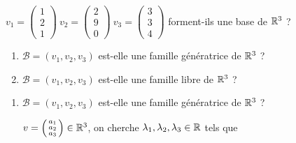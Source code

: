 \begin{frame}
\begin{exemple}

$v_1 = \left(\begin{smallmatrix}1\\2\\1\end{smallmatrix}\right)~ 
  v_2 = \left(\begin{smallmatrix}2\\9\\0\end{smallmatrix}\right)~
  v_3 = \left(\begin{smallmatrix}3\\3\\4\end{smallmatrix}\right)$
  forment-ils une base de $\mathbb{R}^3$ ?

   
\pause
\begin{enumerate}
  \item $\mathcal{B} = (v_1, v_2, v_3)$ est-elle une famille génératrice de $\mathbb{R}^3$ ?
\pause  
  \item $\mathcal{B} = (v_1, v_2, v_3)$ est-elle une famille libre de $\mathbb{R}^3$ ? 
\end{enumerate}

\pause
\begin{enumerate}
  \item $\mathcal{B} = (v_1, v_2, v_3)$ est-elle une famille génératrice de $\mathbb{R}^3$ ?

\pause  
   $v = \left(\begin{smallmatrix}a_1\\ a_2\\ a_3\end{smallmatrix}\right)\in\mathbb{R}^3$\pause,
   on cherche $\lambda_1, \lambda_2, \lambda_3 \in \mathbb{R}$ tels que 
   

\end{enumerate}
\end{exemple}
\end{frame}
